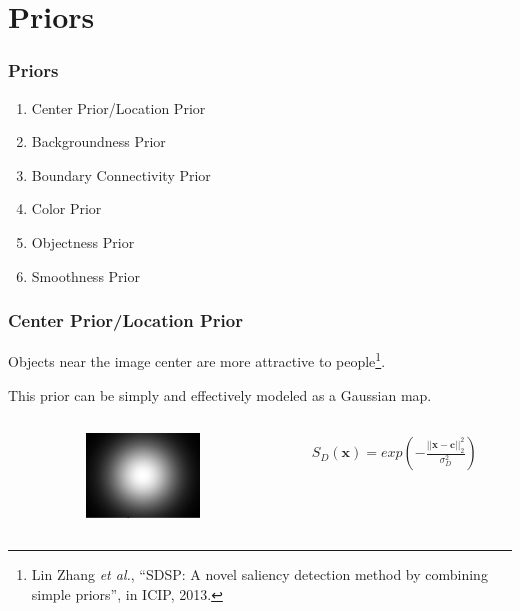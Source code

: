 \documentclass[notheorems,serif,table,compress]{beamer}  %
\begin{document}
\section{Priors}

\begin{frame}
\frametitle{Priors}
\begin{enumerate}
\item Center Prior/Location Prior
\item Backgroundness Prior
\item Boundary Connectivity Prior
\item Color Prior
\item Objectness Prior
\item Smoothness Prior
\end{enumerate}
\end{frame}


\begin{frame}
\frametitle{ Center Prior/Location Prior}
{\color{blue}Objects near the image center are more attractive to people}\footnote{Lin Zhang \textit{et al.}, ``SDSP: A novel saliency detection method by combining simple priors'', in ICIP, 2013.}{\color{blue}.}

\vspace{0.15in}

This prior can be simply and effectively modeled as a Gaussian map.

\vspace{0.15in}

\begin{columns}
\begin{column}{\leftmargini}
\end{column}
\hspace{-1in}
\begin{column}{0.1\linewidth}
\centering\includegraphics[width=3cm]{CenterPrior}
\end{column}
\begin{column}{0.7\linewidth}
\begin{align}
S_D(\textbf{x}) = exp\left(-\frac{||\textbf{x}-\textbf{c}||_2^2}{\sigma_D^2}\right)
\end{align}
\end{column}
\end{columns}\vspace{1ex}
\vspace{-0.4in}
\end{frame}
\end{document}
